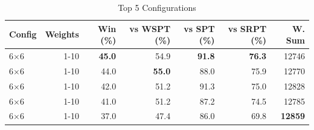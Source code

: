 \begin{table}[htbp]%
\centering%
\begin{tabular}{lrrrrrr}%
\toprule%
\textbf{Config}&\textbf{Weights}&\textbf{Win (\%)}&\textbf{vs WSPT (\%)}&\textbf{vs SPT (\%)}&\textbf{vs SRPT (\%)}&\textbf{W. Sum}\\%
\midrule%
6×6&1-10&\textbf{45.0}&54.9&\textbf{91.8}&\textbf{76.3}&12746\\%
6×6&1-10&44.0&\textbf{55.0}&88.0&75.9&12770\\%
6×6&1-10&42.0&51.2&91.3&75.0&12828\\%
6×6&1-10&41.0&51.2&87.2&74.5&12785\\%
6×6&1-10&37.0&47.4&86.0&69.8&\textbf{12859}\\%
\bottomrule%
\end{tabular}%
\caption{Top 5 Configurations}%
\label{tab:summary}%
\end{table}
